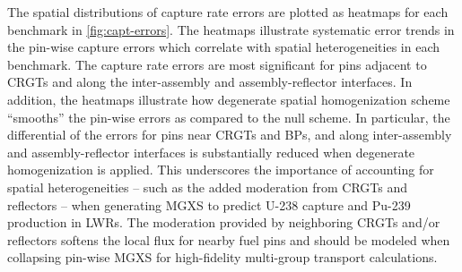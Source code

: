 The spatial distributions of capture rate errors are plotted as heatmaps for each benchmark in \autoref{fig:capt-errors}. The heatmaps illustrate systematic error trends in the pin-wise capture errors which correlate with spatial heterogeneities in each benchmark. The capture rate errors are most significant for pins adjacent to CRGTs and along the inter-assembly and assembly-reflector interfaces. In addition, the heatmaps illustrate how degenerate spatial homogenization scheme ``smooths'' the pin-wise errors as compared to the null scheme. In particular, the differential of the errors for pins near CRGTs and BPs, and along inter-assembly and assembly-reflector interfaces is substantially reduced when degenerate homogenization is applied. This underscores the importance of accounting for spatial heterogeneities -- such as the added moderation from CRGTs and reflectors -- when generating MGXS to predict U-238 capture and Pu-239 production in LWRs. The moderation provided by neighboring CRGTs and/or reflectors softens the local flux for nearby fuel pins and should be modeled when collapsing pin-wise MGXS for high-fidelity multi-group transport calculations. 

